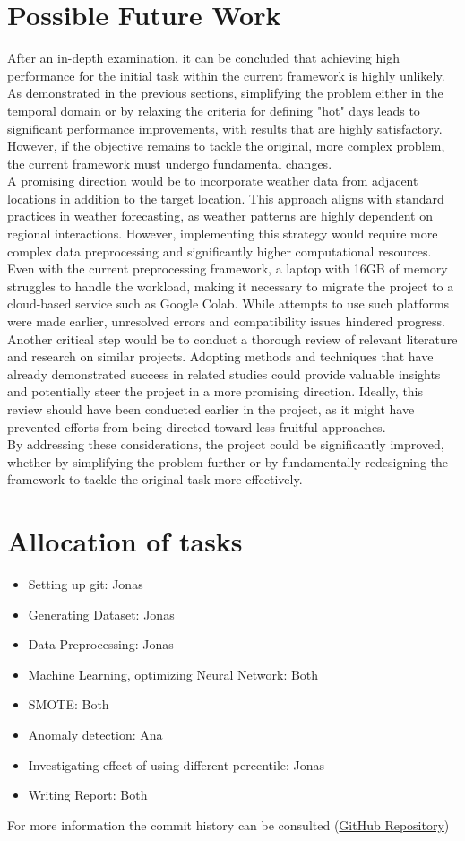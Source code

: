\documentclass[conference,9pt]{IEEEtran}
\begin{document}
\section{Possible Future Work}
After an in-depth examination, it can be concluded that achieving high performance for the initial task within the current framework is highly unlikely. As demonstrated in the previous sections, simplifying the problem either in the temporal domain or by relaxing the criteria for defining "hot" days leads to significant performance improvements, with results that are highly satisfactory. However, if the objective remains to tackle the original, more complex problem, the current framework must undergo fundamental changes.\\
A promising direction would be to incorporate weather data from adjacent locations in addition to the target location. This approach aligns with standard practices in weather forecasting, as weather patterns are highly dependent on regional interactions. However, implementing this strategy would require more complex data preprocessing and significantly higher computational resources. Even with the current preprocessing framework, a laptop with 16GB of memory struggles to handle the workload, making it necessary to migrate the project to a cloud-based service such as Google Colab. While attempts to use such platforms were made earlier, unresolved errors and compatibility issues hindered progress.\\
Another critical step would be to conduct a thorough review of relevant literature and research on similar projects. Adopting methods and techniques that have already demonstrated success in related studies could provide valuable insights and potentially steer the project in a more promising direction. Ideally, this review should have been conducted earlier in the project, as it might have prevented efforts from being directed toward less fruitful approaches.\\
By addressing these considerations, the project could be significantly improved, whether by simplifying the problem further or by fundamentally redesigning the framework to tackle the original task more effectively.


\section{Allocation of tasks}
\begin{itemize}
\item Setting up git: Jonas
\item Generating Dataset: Jonas
\item Data Preprocessing: Jonas
\item Machine Learning, optimizing Neural Network: Both
\item SMOTE: Both
\item Anomaly detection: Ana
\item Investigating effect of using different percentile: Jonas
\item Writing Report: Both
\end{itemize}
For more information the commit history can be consulted (\href{https://github.com/JonasThalmeier/MALIS_heatForecast}{GitHub Repository})
\end{document}
